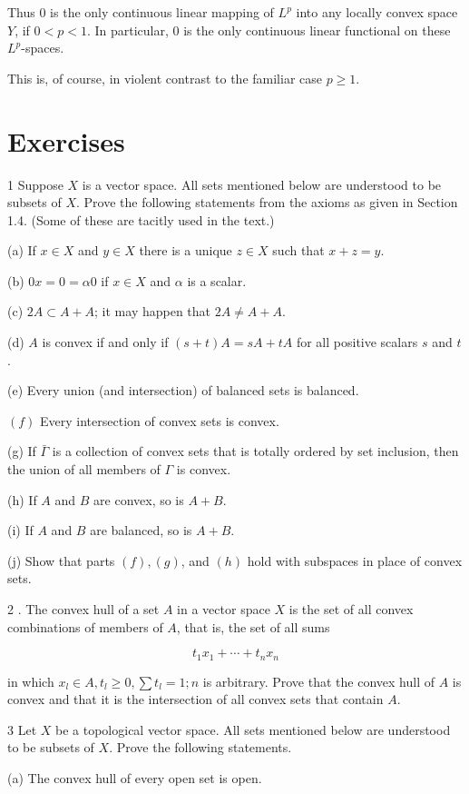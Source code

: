 \documentclass[10pt]{article}
\begin{document}
Thus 0 is the only continuous linear mapping of $L^{p}$ into any locally convex space $Y$, if $0<p<1$. In particular, 0 is the only continuous linear functional on these $L^{p}$-spaces.

This is, of course, in violent contrast to the familiar case $p \geq 1$.

\section{Exercises}
1 Suppose $X$ is a vector space. All sets mentioned below are understood to be subsets of $X$. Prove the following statements from the axioms as given in Section 1.4. (Some of these are tacitly used in the text.)

(a) If $x \in X$ and $y \in X$ there is a unique $z \in X$ such that $x+z=y$.

(b) $0 x=0=\alpha 0$ if $x \in X$ and $\alpha$ is a scalar.

(c) $2 A \subset A+A$; it may happen that $2 A \neq A+A$.

(d) $A$ is convex if and only if $(s+t) A=s A+t A$ for all positive scalars $s$ and $t$.

(e) Every union (and intersection) of balanced sets is balanced.

$(f)$ Every intersection of convex sets is convex.

(g) If $\bar{\Gamma}$ is a collection of convex sets that is totally ordered by set inclusion, then the union of all members of $\Gamma$ is convex.

(h) If $A$ and $B$ are convex, so is $A+B$.

(i) If $A$ and $B$ are balanced, so is $A+B$.

(j) Show that parts $(f),(g)$, and $(h)$ hold with subspaces in place of convex sets.

2 . The convex hull of a set $A$ in a vector space $X$ is the set of all convex combinations of members of $A$, that is, the set of all sums

$$
t_{1} x_{1}+\cdots+t_{n} x_{n}
$$

in which $x_{l} \in A, t_{l} \geq 0, \sum t_{l}=1 ; n$ is arbitrary. Prove that the convex hull of $A$ is convex and that it is the intersection of all convex sets that contain $A$.

3 Let $X$ be a topological vector space. All sets mentioned below are understood to be subsets of $X$. Prove the following statements.

(a) The convex hull of every open set is open.
\end{document}
